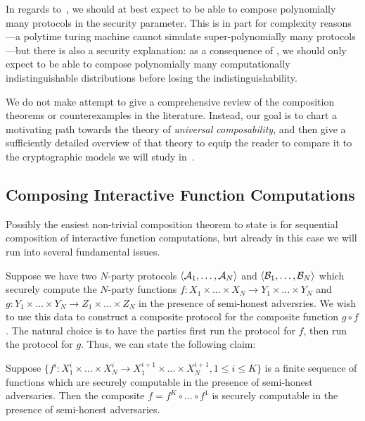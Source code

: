 In regards to~, we should at best expect
to be able to compose polynomially many protocols in the security parameter.
This is in part for complexity reasons---a polytime turing machine cannot
simulate super-polynomially many protocols---but there is also a security
explanation: as a consequence of
, we should only
expect to be able to compose polynomially many computationally indistinguishable
distributions before losing the indistinguishability.

We do not make attempt to give a comprehensive review of the composition
theorems or counterexamples in the literature. Instead, our goal is to chart a
motivating path towards the theory of \emph{universal composability}, and then give a
sufficiently detailed overview of that theory to equip the reader to compare it
to the cryptographic models we will study
in~.

\subsection{Composing Interactive Function Computations}
\label{sec:function-composition}

Possibly the easiest non-trivial composition theorem to state is for sequential
composition of interactive function computations, but already in this case we
will run into several fundamental issues.

Suppose we have two $N$-party protocols $\langle\mathcal{A}_1,\dots,\mathcal{A}_N\rangle$ and
$\langle\mathcal{B}_1,\dots,\mathcal{B}_N\rangle$ which securely compute the $N$-party functions $f:
X_1\times\dots\times X_N\to Y_1\times\dots\times Y_N$ and $g:
Y_1\times\dots\times Y_N\to Z_1\times\dots\times Z_N$ in the presence of
semi-honest adversries. We wish to use this data to construct a composite
protocol for the composite function $g\circ f$. The natural choice is to have
the parties first run the protocol for $f$, then run the protocol for $g$. Thus,
we can state the following claim:

\begin{claim}
  Suppose $\{f^i: X^i_1\times\dots\times X^i_N\to X^{i+1}_1\times\dots\times
  X^{i+1}_N, 1\leq i \leq K\}$ is a finite sequence of functions which are securely
  computable in the presence of semi-honest adversaries. Then the composite $f =
  f^K\circ\dots\circ f^1$ is securely computable in the presence of semi-honest
  adversaries.
\end{claim}

